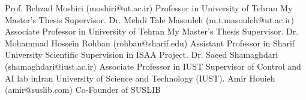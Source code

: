 \documentclass[9pt]{developercv} %
\begin{document}
\begin{entrylist}
	\entry
		{ }
		{Prof. Behzad Moshiri {\small(moshiri@ut.ac.ir)}}
		{Professor in University of Tehran}	
		{My Master’s Thesis Supervisor.}
	\entry
		{ }
		{Dr. Mehdi Tale Masouleh {\small(m.t.masouleh@ut.ac.ir)}}
		{Associate Professor in University of Tehran}	
		{My Master’s Thesis Supervisor.}		
	\entry
		{ }
		{Dr. Mohammad Hossein Rohban {\small(rohban@sharif.edu)}}
		{Assistant Professor in Sharif University}	
		{Scientific Supervision in ISAA Project.}
	\entry
		{ }
		{Dr. Saeed Shamaghdari {\small(shamaghdari@iust.ac.ir)}}
		{Associate Professor in IUST}	
		{Supervisor of Control and AI lab inIran University of Science and Technology (IUST).}
	\entry
		{ }
		{Amir Houieh {\small(amir@suslib.com)}}
		{Co-Founder of SUSLIB}	
		{ }

		
\end{entrylist}
\end{document}
